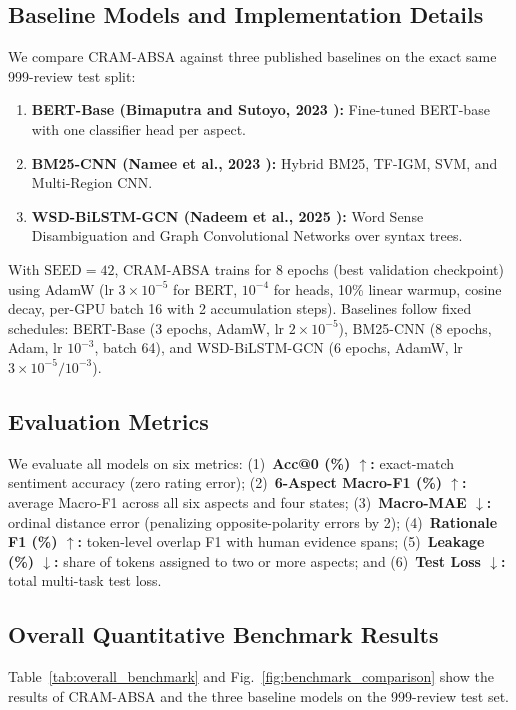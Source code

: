 \documentclass[pdflatex,sn-mathphys-num]{sn-jnl}%
\theoremstyle{thmstyleone}%
\theoremstyle{thmstyletwo}%
\theoremstyle{thmstylethree}%
\begin{document}
\subsection{Baseline Models and Implementation Details}
\label{subsec:baselines_implementation}
We compare CRAM-ABSA against three published baselines on the exact same 999-review test split:
\begin{enumerate}
    \item \textbf{BERT-Base (Bimaputra and Sutoyo, 2023 \cite{ref01_bimaputra2023}):} Fine-tuned BERT-base with one classifier head per aspect.
    \item \textbf{BM25-CNN (Namee et al., 2023 \cite{ref04_namee2023}):} Hybrid BM25, TF-IGM, SVM, and Multi-Region CNN.
    \item \textbf{WSD-BiLSTM-GCN (Nadeem et al., 2025 \cite{ref09_nadeem2025}):} Word Sense Disambiguation and Graph Convolutional Networks over syntax trees.
\end{enumerate}
With $\text{SEED}=42$, CRAM-ABSA trains for 8 epochs (best validation checkpoint) using AdamW (lr $3\times 10^{-5}$ for BERT, $10^{-4}$ for heads, 10\% linear warmup, cosine decay, per-GPU batch 16 with 2 accumulation steps). Baselines follow fixed schedules: BERT-Base (3 epochs, AdamW, lr $2\times 10^{-5}$), BM25-CNN (8 epochs, Adam, lr $10^{-3}$, batch 64), and WSD-BiLSTM-GCN (6 epochs, AdamW, lr $3\times 10^{-5}/10^{-3}$).

\subsection{Evaluation Metrics}
\label{subsec:evaluation_metrics}
We evaluate all models on six metrics: (1)~\textbf{Acc@0 (\%) $\uparrow$:} exact-match sentiment accuracy (zero rating error); (2)~\textbf{6-Aspect Macro-F1 (\%) $\uparrow$:} average Macro-F1 across all six aspects and four states; (3)~\textbf{Macro-MAE $\downarrow$:} ordinal distance error (penalizing opposite-polarity errors by 2); (4)~\textbf{Rationale F1 (\%) $\uparrow$:} token-level overlap F1 with human evidence spans; (5)~\textbf{Leakage (\%) $\downarrow$:} share of tokens assigned to two or more aspects; and (6)~\textbf{Test Loss $\downarrow$:} total multi-task test loss.

\FloatBarrier
\subsection{Overall Quantitative Benchmark Results}
\label{subsec:overall_results}
Table~\ref{tab:overall_benchmark} and Fig.~\ref{fig:benchmark_comparison} show the results of CRAM-ABSA and the three baseline models on the 999-review test set.
\end{document}
